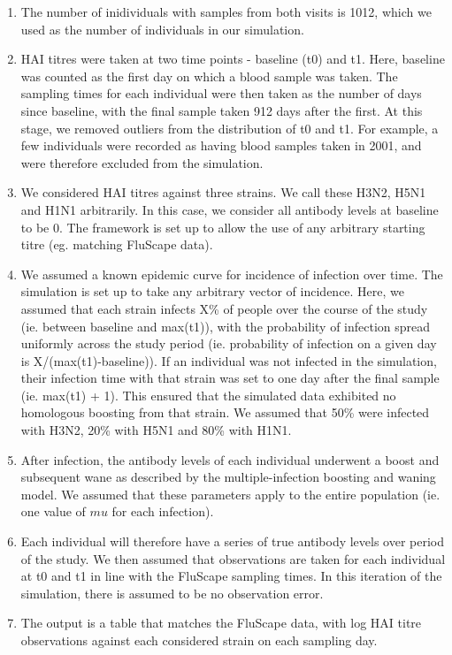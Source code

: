\documentclass[a4paper,11pt,twoside]{article}
\begin{document}
\begin{enumerate}
\item The number of inidividuals with samples from both visits is 1012, which we used as the number of individuals in our simulation.
\item HAI titres were taken at two time points - baseline (t0) and t1. Here, baseline was counted as the first day on which a blood sample was taken. The sampling times for each individual were then taken as the number of days since baseline, with the final sample taken 912 days after the first. At this stage, we removed outliers from the distribution of t0 and t1. For example, a few individuals were recorded as having blood samples taken in 2001, and were therefore excluded from the simulation.
\item We considered HAI titres against three strains. We call these H3N2, H5N1 and H1N1 arbitrarily. In this case, we consider all antibody levels at baseline to be 0. The framework is set up to allow the use of any arbitrary starting titre (eg. matching FluScape data).
\item We assumed a known epidemic curve for incidence of infection over time. The simulation is set up to take any arbitrary vector of incidence. Here, we assumed that each strain infects X\% of people over the course of the study (ie. between baseline and max(t1)), with the probability of infection spread uniformly across the study period (ie. probability of infection on a given day is X/(max(t1)-baseline)). If an individual was not infected in the simulation, their infection time with that strain was set to one day after the final sample (ie. max(t1) + 1). This ensured that the simulated data exhibited no homologous boosting from that strain. We assumed that 50\% were infected with H3N2, 20\% with H5N1 and 80\% with H1N1.
\item After infection, the antibody levels of each individual underwent a boost and subsequent wane as described by the multiple-infection boosting and waning model. We assumed that these parameters apply to the entire population (ie. one value of $mu$ for each infection).
\item Each individual will therefore have a series of true antibody levels over period of the study. We then assumed that observations are taken for each individual at t0 and t1 in line with the FluScape sampling times. In this iteration of the simulation, there is assumed to be no observation error.
\item The output is a table that matches the FluScape data, with log HAI titre observations against each considered strain on each sampling day.
\end{enumerate}
\end{document}
